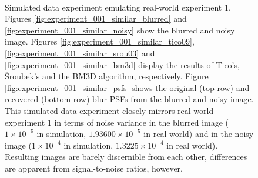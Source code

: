 \documentclass[12pt,notitlepage]{report}
\begin{document}
\begin{figure}[t]
	  ~
	  ~
  \caption[Simulated data experiment emulating real-world experiment 1]{Simulated data experiment emulating real-world experiment 1. Figures \ref{fig:experiment_001_similar_blurred} and \ref{fig:experiment_001_similar_noisy} show the blurred and noisy image. Figures \ref{fig:experiment_001_similar_tico09}, \ref{fig:experiment_001_similar_srou03} and \ref{fig:experiment_001_similar_bm3d} display the results of Tico's, Šroubek's and the BM3D algorithm, respectively. Figure \ref{fig:experiment_001_similar_psfs} shows the original (top row) and recovered (bottom row) blur PSFs from the blurred and noisy image. This simulated-data experiment closely mirrors real-world experiment 1 in terms of noise variance in the blurred image ($1 \times 10^{-5}$ in simulation, $1.93600 \times 10^{-5}$ in real world) and in the noisy image ($1 \times 10^{-4}$ in simulation, $1.3225 \times 10^{-4}$ in real world). Resulting images are barely discernible from each other, differences are apparent from signal-to-noise ratios, however.}
  \label{fig:experiment_001_similar}
\end{figure}
\end{document}
